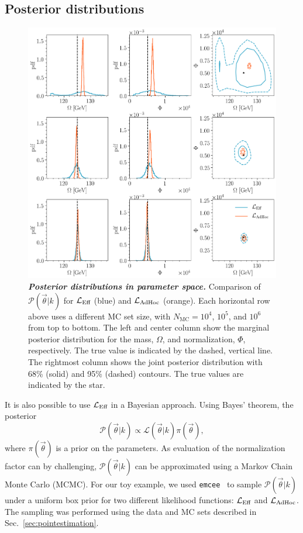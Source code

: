 \documentclass[a4paper, 11pt]{article}
\newcommand{\like}{\mathcal{L}}
\newcommand{\vectheta}{\vec{\theta}}
\newcommand{\prob}{\mathcal{P}}
\newcommand{\mcl}{\like_\textmd{Eff}}
\newcommand{\adhoc}{\mathcal{L}_{\textmd{AdHoc}}}
\newcommand{\emcee}{\texttt{emcee}}
\begin{document}
\subsection{Posterior distributions}
\label{sec:posterior}

\begin{figure}[ht]
\centering
    \includegraphics[width=1\linewidth]{fig/fig6}
\caption{\textbf{\textit{Posterior distributions in parameter space.}} Comparison of $\prob(\vectheta|k)$ for $\mcl$ (blue) and $\adhoc$ (orange). Each horizontal row above uses a different MC set size, with $N_\mathrm{MC}=10^4$, $10^5$, and $10^6$ from top to bottom. The left and center column show the marginal posterior distribution for the mass, $\Omega$, and normalization, $\Phi$, respectively. The true value is indicated by the dashed, vertical line. The rightmost column shows the joint posterior distribution with 68\% (solid) and 95\% (dashed) contours. The true values are indicated by the star.}
\label{fig:llhdist}
\end{figure}

It is also possible to use $\mcl$ in a Bayesian approach. Using Bayes' theorem, the posterior
\begin{equation}
\prob(\vectheta|k) \propto \like(\vectheta|k) \pi(\vectheta),
\end{equation}
where $\pi(\vectheta)$ is a prior on the parameters. As evaluation of the normalization factor can by challenging, $\prob(\vectheta|k)$ can be approximated using a Markov Chain Monte Carlo (MCMC). For our toy example, we used \emcee{}~\cite{ForemanMackey:2012ig} to sample $\prob(\vectheta|k)$ under a uniform box prior for two different likelihood functions: $\mcl$ and $\adhoc$. The sampling was performed using the data and MC sets described in Sec.~\ref{sec:pointestimation}.
\end{document}
